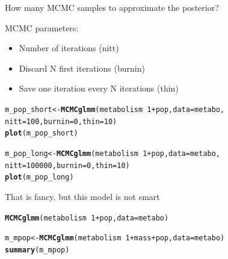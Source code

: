 \documentclass[10pt]{beamer}\usepackage[]{graphicx}\usepackage[]{color}
\makeatletter
\newcommand{\hlnum}[1]{\textcolor[rgb]{0.686,0.059,0.569}{#1}}%
\newcommand{\hlopt}[1]{\textcolor[rgb]{0,0,0}{#1}}%
\newcommand{\hlstd}[1]{\textcolor[rgb]{0.345,0.345,0.345}{#1}}%
\newcommand{\hlkwb}[1]{\textcolor[rgb]{0.69,0.353,0.396}{#1}}%
\newcommand{\hlkwc}[1]{\textcolor[rgb]{0.333,0.667,0.333}{#1}}%
\newcommand{\hlkwd}[1]{\textcolor[rgb]{0.737,0.353,0.396}{\textbf{#1}}}%
\newenvironment{kframe}{%
 \def\at@end@of@kframe{}%
 \ifinner\ifhmode%
  \def\at@end@of@kframe{\end{minipage}}%
  \begin{minipage}{\columnwidth}%
 \fi\fi%
 \def\FrameCommand##1{\hskip\@totalleftmargin \hskip-\fboxsep
 \colorbox{shadecolor}{##1}\hskip-\fboxsep
     \hskip-\linewidth \hskip-\@totalleftmargin \hskip\columnwidth}%
 \MakeFramed {\advance\hsize-\width
   \@totalleftmargin\z@ \linewidth\hsize
   \@setminipage}}%
 {\par\unskip\endMakeFramed%
 \at@end@of@kframe}
\newenvironment{knitrout}{}{} %
\makeatother
\begin{document}
\begin{frame}[fragile]{How many MCMC samples to approximate the posterior?}

MCMC parameters: \begin{itemize}
\item Number of iterations (nitt)
\item Discard N first iterations (burnin)
\item Save one iteration every N iterations (thin)
\end{itemize}

\begin{knitrout}\small
{}\color{fgcolor}\begin{kframe}
\begin{alltt}
\hlstd{m_pop_short} \hlkwb{<-} \hlkwd{MCMCglmm}\hlstd{(metabolism} \hlopt{~} \hlnum{1} \hlopt{+} \hlstd{pop,} \hlkwc{data} \hlstd{= metabo,}
                        \hlkwc{nitt} \hlstd{=} \hlnum{100}\hlstd{,} \hlkwc{burnin} \hlstd{=} \hlnum{0}\hlstd{,} \hlkwc{thin} \hlstd{=} \hlnum{10}\hlstd{)}
\hlkwd{plot}\hlstd{(m_pop_short)}

\hlstd{m_pop_long} \hlkwb{<-} \hlkwd{MCMCglmm}\hlstd{(metabolism} \hlopt{~} \hlnum{1} \hlopt{+} \hlstd{pop,} \hlkwc{data} \hlstd{= metabo,}
                        \hlkwc{nitt} \hlstd{=} \hlnum{100000}\hlstd{,} \hlkwc{burnin} \hlstd{=} \hlnum{0}\hlstd{,} \hlkwc{thin} \hlstd{=} \hlnum{10}\hlstd{)}
\hlkwd{plot}\hlstd{(m_pop_long)}
\end{alltt}
\end{kframe}
\end{knitrout}

\end{frame}

\begin{frame}[fragile]{That is fancy, but this model is not smart}
 
\begin{knitrout}\small
{}\color{fgcolor}\begin{kframe}
\begin{alltt}
 \hlkwd{MCMCglmm}\hlstd{(metabolism} \hlopt{~} \hlnum{1} \hlopt{+} \hlstd{pop,} \hlkwc{data} \hlstd{= metabo)}
\end{alltt}
\end{kframe}
\end{knitrout}

 \pause

\begin{knitrout}\small
{}\color{fgcolor}\begin{kframe}
\begin{alltt}
\hlstd{m_mpop} \hlkwb{<-} \hlkwd{MCMCglmm}\hlstd{(metabolism} \hlopt{~} \hlnum{1} \hlopt{+} \hlstd{mass} \hlopt{+} \hlstd{pop,} \hlkwc{data} \hlstd{= metabo)}
\hlkwd{summary}\hlstd{(m_mpop)}
\end{alltt}
\end{kframe}
\end{knitrout}
 
\end{frame}
\end{document}
